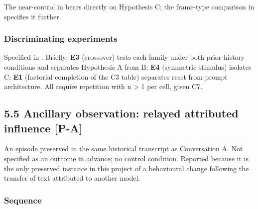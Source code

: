 The near-control in  bears directly on Hypothesis C; the frame-type comparison in  specifies it further.


\subsubsection*{Discriminating experiments}
\label{sec:en:x-discriminating-experiments}

Specified in . Briefly: \textbf{E3} (crossover) tests each family under both prior-history conditions and separates Hypothesis A from B; \textbf{E4} (symmetric stimulus) isolates C; \textbf{E1} (factorial completion of the C3 table) separates reset from prompt architecture. All require repetition with n > 1 per cell, given C7.


\subsection*{5.5 Ancillary observation: relayed attributed influence \textbf{[P-A]}}
\label{sec:en:5.5}

An episode preserved in the same historical transcript as Conversation A. Not specified as an outcome in advance; no control condition. Reported because it is the only preserved instance in this project of a behavioural change following the transfer of text attributed to another model.


\subsubsection*{Sequence}
\label{sec:en:x-sequence}

